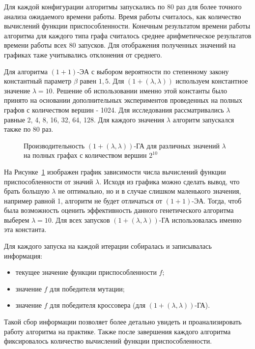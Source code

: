 \documentclass[times]{itmo-student-thesis}
\newcommand{\alglambda}{${(1 + (\lambda , \lambda))}$\xspace}
\newcommand{\alglambdaf}{${(1 + (\lambda , \lambda))}$-ГА\xspace}
\newcommand{\oea}{\mbox{$(1 + 1)$-ЭА}\xspace}
\newcommand{\ollga}{${(1 + (\lambda , \lambda))}$-ГА\xspace}
\begin{document}
Для каждой конфигурации алгоритмы запускались по 80 раз для более точного анализа ожидаемого времени работы. Время работы считалось, как количество вычислений функции приспособленности. Конечным результатом времени работы алгоритма для каждого типа графа считалось среднее арифметическое результатов времени работы всех 80 запусков. Для отображения полученных значений на графиках таже учитывались отклонения от среднего.

Для алгоритма \oea с выбором вероятности по степенному закону константный параметр $\beta$ равен $1,5$. Для \alglambda используем константное значение $\lambda = 10$.
Решение об использовании именно этой константы было принято на основании дополнительных экспериментов проведенных на полных графов с количеством вершин - 1024. Для исследования рассматривались $\lambda$ равные 2, 4, 8, 16, 32, 64, 128. Для каждого значения $\lambda$ алгоритм запускался также по 80 раз.

\begin{figure}[t!]
\caption{Производительность \ollga для различных значений $\lambda$ на полных графах с количеством вершин $2^{10}$}
\label{fig:lambda}
\end{figure}

На Рисунке~\ref{fig:lambda} изображен график зависимости числа вычислений функции приспособленности от значий $\lambda$. Исходя из графика можно сделать вывод, что брать большую $\lambda$ не оптимально, но и в случае слишком маленького значения, например равной 1, алгоритм не будет отличаться от \oea. Тогда, чтоб была возможность оценить эффективность данного генетического алгоритма выберем $\lambda = 10$. Для всех запусков \alglambdaf использовалась именно эта константа.

Для каждого запуска на каждой итерации собиралась и записывалась  информация:
\begin{itemize}
 \item текущее значение функции приспособленности $f$;
 \item значение $f$ для победителя мутации;
 \item значение $f$ для победителя кроссовера (для \alglambdaf).
\end{itemize}
Такой сбор информации позволяет более детально увидеть и проанализировать работу алгоритма на практике.
Также после завершения каждого алгоритма фиксировалось количество вычислений функции приспособленности.
\end{document}
